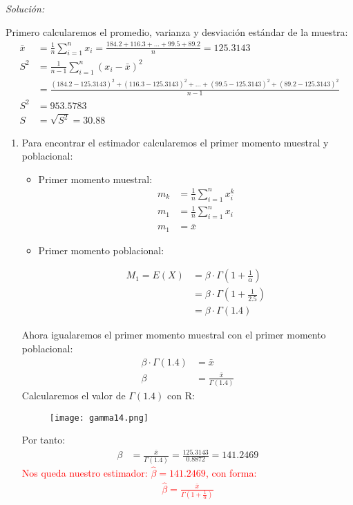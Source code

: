 \documentclass[12pt]{article}
\newenvironment{sol}
    {\emph{Solución:}
    }
    {
    }
\begin{document}
\begin{sol}

Primero calcularemos el promedio, varianza y desviación estándar de la muestra:
\begin{align*}
\bar{x} &= \frac{1}{n} \sum_{i=1}^{n}x_i=\frac{184.2+116.3+...+99.5+89.2}{n} =  125.3143 \\
S^2 &= \frac{1}{n-1} \sum_{i=1}^{n} (x_i - \bar{x})^2 \\
&=\frac{(184.2-125.3143)^2 + (116.3-125.3143)^2 +...+(99.5-125.3143)^2 +(89.2-125.3143)^2 }{n-1}\\
S^2 &=953.5783 \\
S &= \sqrt{S^2}=30.88
\end{align*}
\begin{enumerate}[label=\alph*)] %
    
\item Para encontrar el estimador calcularemos el primer momento muestral y poblacional:
\begin{itemize}
\item Primer momento muestral:
\begin{align*}
	m_k &= \frac{1}{n} \sum_{i=1}^{n}x_i^k \\
	m_1 &= \frac{1}{n} \sum_{i=1}^{n}x_i \\
	m_1 &= \bar{x}
\end{align*}

\pagebreak

\item Primer momento poblacional:

\begin{align*}
M_1 = E(X) &= \beta \cdot \Gamma(1+\frac{1}{\alpha}) \\
 &= \beta \cdot \Gamma (1+\frac{1}{2.5}) \\
 &= \beta \cdot \Gamma(1.4)
\end{align*}	
\end{itemize}
Ahora igualaremos el primer momento muestral con el primer momento poblacional:
\begin{align*}
\beta \cdot \Gamma(1.4) &= \bar{x}\\
\beta &= \frac{\bar{x}}{\Gamma(1.4)}
\end{align*}
Calcularemos el valor de $\Gamma(1.4)$ con R:
\begin{figure}[h]  %
    \centering      %
    \texttt{[image: gamma14.png]} 
\end{figure}
Por tanto:
\begin{align*}
\beta &= \frac{\bar{x}}{\Gamma(1.4)}= \frac{125.3143}{0.8872}=141.2469
\end{align*}
\textcolor{red}{%
    Nos queda nuestro estimador: 
    \begin{math}
       \hat{\beta} = 141.2469
    \end{math}, con forma:
    \begin{align*}
       \hat{\beta} = \frac{\bar{x}}{\Gamma\left(1+\frac{1}{\alpha}\right)}
    \end{align*}    
}


\end{enumerate}
\end{sol}
\end{document}
